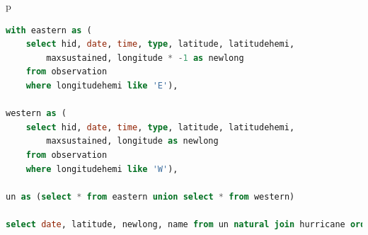 \documentclass[11pt, oneside]{amsart}   	%
\begin{document}
p
\begin{lstlisting}[language=SQL]
with eastern as (
    select hid, date, time, type, latitude, latitudehemi, 
        maxsustained, longitude * -1 as newlong
    from observation
    where longitudehemi like 'E'),

western as (
    select hid, date, time, type, latitude, latitudehemi, 
        maxsustained, longitude as newlong
    from observation
    where longitudehemi like 'W'),
    
un as (select * from eastern union select * from western)

select date, latitude, newlong, name from un natural join hurricane order by newlong limit 1;
\end{lstlisting}
\end{document}
